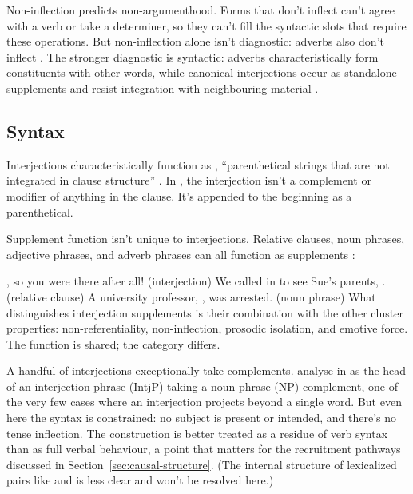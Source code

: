 \documentclass[12pt]{article}
\begin{document}
Non-inflection predicts
non-argumenthood. Forms that don't inflect can't agree with a verb or take
a determiner, so they can't fill the syntactic slots that require these
operations. But non-inflection alone isn't diagnostic: adverbs also don't
inflect \citep[106]{ameka1992}. The stronger diagnostic is syntactic:
adverbs characteristically form constituents with other words, while
canonical interjections occur as standalone supplements and resist
integration with neighbouring material \citep[152]{meinard2015}.

\subsection{Syntax}

Interjections characteristically function as ,
\enquote{parenthetical strings that are not integrated in clause
structure} \citep[1350]{HuddlestonPullum2002}. In , the
interjection isn't a complement or modifier of anything in the clause.
It's appended to the beginning as a parenthetical.

Supplement function isn't unique to interjections. Relative clauses, noun
phrases, adjective phrases, and adverb phrases can all function as
supplements \citep[1356]{HuddlestonPullum2002}:

\ea\label{ex:supplements}
  \ea {}, so you were there after all! \hfill (interjection)
  \ex We called in to see Sue's parents, . \hfill (relative clause)
  \ex A university professor, , was arrested. \hfill (noun phrase)
  \z
\z
What distinguishes interjection supplements is their combination with
the other cluster properties: non-referentiality, non-inflection,
prosodic isolation, and emotive force. The function is shared; the
category differs.

A handful of interjections exceptionally take complements.
\textcite[1361fn]{HuddlestonPullum2002} analyse  in
 as the head of an interjection phrase
(IntjP) taking a noun phrase (NP) complement, one of the very few cases where an
interjection projects beyond a single word. But even here the syntax is
constrained: no subject is present or intended, and there's no tense
inflection. The construction is better treated as a residue of verb
syntax than as full verbal behaviour, a point that matters for the
recruitment pathways
discussed in Section~\ref{sec:causal-structure}. (The internal structure of
lexicalized pairs like
 and  is less clear and won't be
resolved here.)
\end{document}
